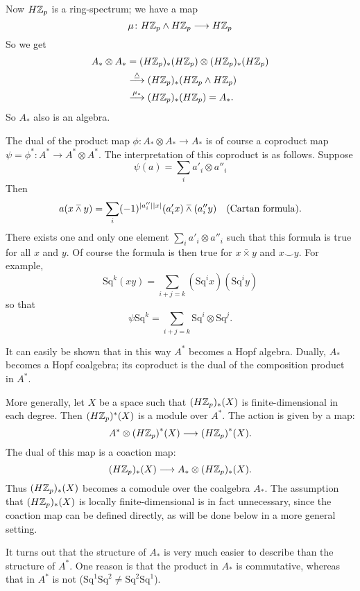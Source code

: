 \documentclass[../main]{subfiles}
\begin{document}
Now $H\mathbb{Z}_p$ is a ring-spectrum; we have a map
\[ \mu\colon H\mathbb{Z}_p\wedge H\mathbb{Z}_p\longrightarrow H\mathbb{Z}_p \]
So we get
\begin{align*}
    A_\ast\otimes A_\ast &= (H\mathbb{Z}_p)_\ast(H\mathbb{Z}_p)\otimes(H\mathbb{Z}_p)_\ast(H\mathbb{Z}_p) \\
    &\overset{\underline{\wedge}}\longrightarrow(H\mathbb{Z}_p)_\ast(H\mathbb{Z}_p\wedge H\mathbb{Z}_p) \\
    &\overset{\mu_\ast}\longrightarrow(H\mathbb{Z}_p)_\ast(H\mathbb{Z}_p)=A_\ast.
\end{align*}
So $A_\ast$ also is an algebra.

The dual of the product map $\phi\colon A_\ast\otimes A_\ast\longrightarrow A_\ast$ is of course a coproduct map $\psi=\phi^\ast\colon A^\ast\longrightarrow A^\ast\otimes A^\ast$. The interpretation of this coproduct is as follows. Suppose
\[ \psi(a) = \sum_ia'_i\otimes a''_i \]
Then
\[ a(x\barwedge y)=\sum_i(-1)^{\lvert a''_i\rvert\lvert x\rvert}(a'_ix)\barwedge(a''_iy) \quad \text{(Cartan formula).} \]
There exists one and only one element $\sum\limits_i a'_i\otimes a''_i$ such that this formula is true for all $x$ and $y$. Of course the formula is then true for $x\bar\times y$ %
and $x\smile y$. %
For example,
\[ \mathrm{Sq}^k(xy)=\sum_{i+j=k} (\mathrm{Sq}^ix)(\mathrm{Sq}^iy) \]
so that
\[ \psi \mathrm{Sq}^k=\sum_{i+j=k} \mathrm{Sq}^i\otimes \mathrm{Sq}^j. \]

It can easily be shown that in this way $A^\ast$ becomes a Hopf algebra. Dually, $A_\ast$ becomes a Hopf coalgebra; its coproduct is the dual of the composition product in $A^\ast$. %

More generally, let $X$ be a space such that $(H\mathbb{Z}_p)_\ast(X)$ is finite-dimensional in each degree. Then $(H\mathbb{Z}_p)^\ast(X)$ is a module over $A^\ast$. The action is given by a map:
\[ A^\ast\otimes{(H\mathbb{Z}_p)}^\ast(X)\longrightarrow{(H\mathbb{Z}_p)}^\ast(X) . \]
The dual of this map is a coaction map:
\[ (H\mathbb{Z}_p)_\ast(X)\longrightarrow A_\ast\otimes(H\mathbb{Z}_p)_\ast(X) . \]
Thus $(H\mathbb{Z}_p)_\ast(X)$ becomes a comodule over the coalgebra $A_\ast$. The assumption that $(H\mathbb{Z}_p)_\ast(X)$ is locally finite-dimensional is in fact unnecessary, since the coaction map can be defined directly, as will be done below in a more general setting.

It turns out that the structure of $A_\ast$ is very much easier to describe than the structure of $A^\ast$. One reason is that the product in $A_\ast$ is commutative, whereas that in $A^\ast$ is not ($\mathrm{Sq}^1\mathrm{Sq}^2\neq \mathrm{Sq}^2\mathrm{Sq}^1$).
\end{document}
